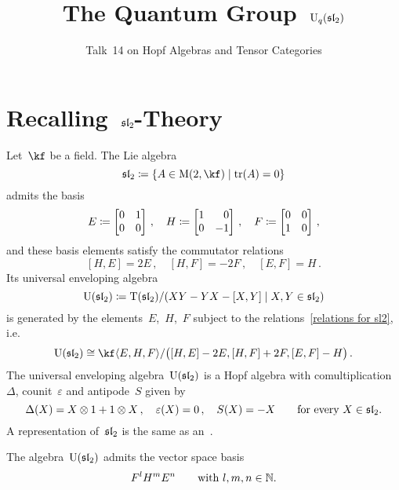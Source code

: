 \documentclass[a4paper, 11pt, oneside]{scrartcl}
\title{The Quantum Group~$\operatorname{U}_q(\mathfrak{sl}_2)$}
\subtitle{Talk~14 on Hopf Algebras and Tensor Categories}
\author{}
\date{}
\begin{document}
\maketitle

\vspace{-4em}





\section{Recalling~\texorpdfstring{$\mathfrak{sl}_2$}{sl2}-Theory}

Let~$\kf$ be a field.
The Lie algebra
\[
  \sllie_2
  \defined
  \{
    A \in \Mat(2, \kf)
  \suchthat
    \tr(A) = 0
  \}
\]
admits the basis
\[
  E
  \defined
  \begin{bmatrix}
    0 & 1 \\
    0 & 0
  \end{bmatrix} \,,
  \quad
  H
  \defined
  \begin{bmatrix*}[r]
    1 &  0 \\
    0 & -1
  \end{bmatrix*} \,,
  \quad
  F
  \defined
  \begin{bmatrix}
    0 & 0 \\
    1 & 0
  \end{bmatrix} \,,
\]
and these basis elements satisfy the commutator relations
\begin{equation}
  \label{relations for sl2}
  [H, E] = 2E \,,
  \quad
  [H, F] = -2F \,,
  \quad
  [E, F] = H \,.
\end{equation}
Its universal enveloping algebra
\[
  \Univ(\sllie_2)
  \defined
  \Tensor(\sllie_2)
  /
  \genideal{ XY - YX - [X,Y] \suchthat X, Y \in \sllie_2 }
\]
is generated by the elements~$E$,~$H$,~$F$ subject to the relations~\eqref{relations for sl2}, i.e.
\[
  \Univ(\sllie_2)
  \cong
  \kf\gen{E, H, F}
  /
  \genideal[\big]{[H,E] - 2E, [H,F] + 2F, [E,F] - H} \,.
\]
The universal enveloping algebra~$\operatorname{U}(\mathfrak{sl}_2)$ is a Hopf algebra with comultiplication~$\Delta$, counit~$\varepsilon$ and antipode~$S$ given by
\[
  \Delta(X) = X \otimes 1 + 1 \otimes X \,,
  \quad
  \varepsilon(X) = 0 \,,
  \quad
  S(X) = -X
  \qquad
  \text{for every~$X \in \mathfrak{sl}_2$}.
\]
A representation of~$\mathfrak{sl}_2$ is the same as an~.

\begin{theorem}
  The algebra~$\operatorname{U}(\mathfrak{sl}_2)$ admits the vector space basis
  \[
    F^l H^m E^n
    \qquad
    \text{with~$l, m, n \in \mathbb{N}$.}
  \]
\end{theorem}
\end{document}
